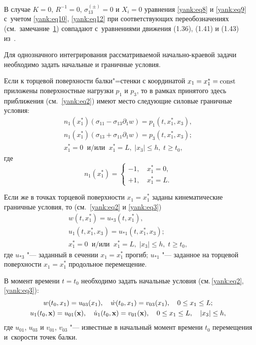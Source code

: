 В случае $K=0$, $R^{-1}=0$, $\sigma _{13}^{(\pm )} =0$ и $X_i =0$ уравнения
\eqref{yank:eq8} и \eqref{yank:eq9} с~учетом \eqref{yank:eq10}, \eqref{yank:eq12} при соответствующих переобозначениях (см.~замечание~\hyperlink{yan:rem:1}{1}) совпадают с~уравнениями движения (1.36), (1.41) и (1.43) из~\cite{yank:bib13}.

Для однозначного интегрирования рассматриваемой начально-краевой задачи
необходимо задать начальные и граничные условия.

Если к торцевой поверхности балки"=стенки с координатой $x_1 =x_1^\ast
=\rm{const}$ приложены поверхностные нагрузки $p_1$ и $p_3$, то в рамках
принятого здесь приближения (см.~\eqref{yank:eq2}) имеют место следующие силовые
граничные условия:
\begin{gather}
\label{yank:eq14}
n_1  ( x_1^\ast ) (\sigma _{11} -\sigma _{13} \partial _1 w )=p_1 (t,x_1^\ast,x_3 ),
\\
\label{yank:eq15}
n_1 (x_1^\ast) (\sigma _{13} +\sigma _{11} \partial _1 w )=p_3 (t,x_1^\ast,x_3 );\\
x_1^\ast =0 ~ \text{~и/или~} ~ x_1^\ast =L,\; |x_3 |\le h,\; t\ge t_0,
\end{gather}
где
\begin{equation}
\label{yank:eq16}
n_1 \left(x_1^\ast\right)=\begin{cases}
 -1,\quad x_1^\ast =0, \\
 +1,\quad x_1^\ast =L.
\end{cases}
\end{equation}

Если же в точках торцевой поверхности $x_1 =x_1^\ast $ заданы кинематические
граничные условия, то (см.~\eqref{yank:eq2} и \eqref{yank:eq3})
\begin{gather}
\label{yank:eq17}
w (t,x_1^\ast )=u_{\ast 3} ( t,x_1^\ast ),
\\
\label{yank:eq18}
u_1 (t,x_1^\ast,x_3 )=u_{\ast 1} (t,x_1^\ast,x_3 );
\\
x_1^\ast =0 ~ \text{~и/или~} ~ x_1^\ast =L,\; |x_3 |\le h,\; t\ge t_0,
\end{gather}
где $u_{\ast 3}$ "--- заданный в сечении $x_1 =x_1^\ast $ прогиб; $u_{\ast 1}
$ "--- заданное на торцевой поверхности $x_1 =x_1^\ast $ продольное перемещение.

В момент времени $t=t_0$ необходимо задать начальные условия (см.\,\eqref{yank:eq2},\,\eqref{yank:eq3}):
\begin{gather}
\label{yank:eq19}
w (t_0,x_1 )=u_{03} (x_1),\quad \dot {w} (t_0,x_1 )=v_{03} (x_1),\quad 0\le x_1 \le L;\\
\label{yank:eq20}
u_1 (t_0,{\rm {\bf x}} )=u_{01} ({\bf x}),\quad \dot {u}_1 (t_0,{\bf x})=v_{01} ({\bf x}),\quad 0\le x_1 \le
L,\quad |x_3|\le h,
\end{gather}
где $u_{01} $, $u_{03} $ и $v_{01} $, $v_{03} $ "--- известные в начальный момент времени $t_0 $ перемещения и~скорости точек балки.

